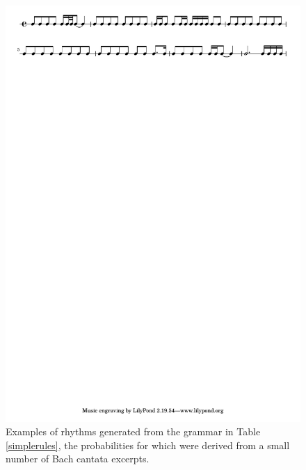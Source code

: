 \documentclass{article}
\begin{document}
\begin{figure}[t] %
\centering
\includegraphics[width=16cm]{bach_output.pdf}
\caption{Examples of rhythms generated from the grammar in Table \ref{simplerules}, the probabilities for which were derived from a small number of Bach cantata excerpts.}\label{learninggen}
\end{figure}
\end{document}
